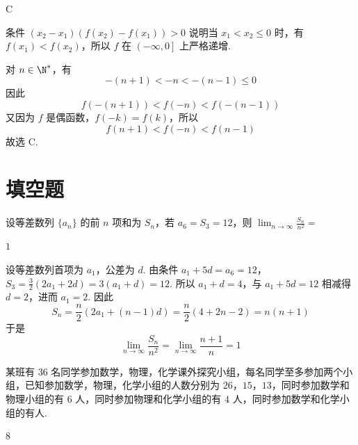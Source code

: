 \begin{answer}
C
\end{answer}

\begin{solution}
条件
\(\left(x_{2}-x_{1}\right)\left(f\left(x_{2}\right)-f\left(x_{1}\right)\right)>0\)
说明当 \(x_{1}<x_{2}\leqslant0\) 时，有 \(f\left(x_{1}\right)<f\left(x_{2}\right)\)，所以 \(f\) 在 \(\left(-\infty,0\right]\) 上严格递增.

对 \(n\in\N^{*}\)，有
\[
-(n+1)<-n<-(n-1)\leqslant0
\]
因此
\[
f\left(-(n+1)\right)<f\left(-n\right)<f\left(-(n-1)\right)
\]
又因为 \(f\) 是偶函数，\(f\left(-k\right)=f\left(k\right)\)，所以
\[
f\left(n+1\right)<f\left(-n\right)<f\left(n-1\right)
\]
故选 C.
\end{solution}

\section{填空题}

\begin{problem}
设等差数列 \(\{a_{n}\}\) 的前 \(n\) 项和为 \(S_{n}\)，若 \(a_{6} = S_{3} = 12\)，则 \(\displaystyle\lim_{n\to \infty}\frac{S_n}{n^2} =\)\fillinblank{}

\end{problem}

\begin{answer}
\(1\)
\end{answer}

\begin{solution}
设等差数列首项为 \(a_{1}\)，公差为 \(d\). 由条件
\(a_{1}+5d=a_{6}=12\)，\(S_{3}=\frac{3}{2}\left(2a_{1}+2d\right)=3\left(a_{1}+d\right)=12\).
所以 \(a_{1}+d=4\)，与 \(a_{1}+5d=12\) 相减得 \(d=2\)，进而 \(a_{1}=2\). 因此
\[
S_{n}=\frac{n}{2}\left(2a_{1}+(n-1)d\right)=\frac{n}{2}\left(4+2n-2\right)=n(n+1)
\]
于是
\[
\lim_{n\to\infty}\frac{S_{n}}{n^{2}}=\lim_{n\to\infty}\frac{n+1}{n}=1
\]
\end{solution}

\begin{problem}
某班有 \(36\) 名同学参加数学，物理，化学课外探究小组，每名同学至多参加两个小组，已知参加数学，物理，化学小组的人数分别为 \(26\)，\(15\)，\(13\)，同时参加数学和物理小组的有 \(6\) 人，同时参加物理和化学小组的有 \(4\) 人，同时参加数学和化学小组的有\fillinblank{}人.

\end{problem}

\begin{answer}
\(8\)
\end{answer}

